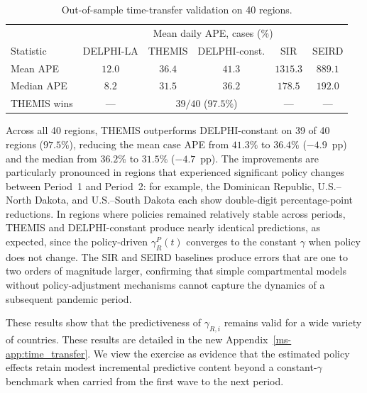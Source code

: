 \documentclass[letterpaper,twoside,11pt]{reviewresponse}
\begin{document}
\begin{enumerate}
    \begin{table}[h!]
    \centering
    \begin{tabular}{|l|ccccc|}
    \hline
    & \multicolumn{5}{c|}{Mean daily APE, cases (\%)} \\
    Statistic & DELPHI-LA  & THEMIS & DELPHI-const. & SIR & SEIRD \\\hline
    Mean APE   & $12.0$  & $\mathbf{36.4}$ & $41.3$ & $1315.3$ & $889.1$ \\
    Median APE & $8.2$   & $\mathbf{31.5}$ & $36.2$ & $178.5$  & $192.0$ \\
    THEMIS wins & --- & \multicolumn{2}{c}{$39/40$ ($97.5\%$)} & --- & --- \\\hline
    \end{tabular}
    \caption{Out-of-sample time-transfer validation on 40 regions.}
    \label{tab:time_transfer_expanded}
    \end{table}
    
    Across all 40 regions, THEMIS outperforms DELPHI-constant on 39 of 40 regions ($97.5\%$), reducing the mean case APE from $41.3\%$ to $36.4\%$ ($-4.9$~pp) and the median from $36.2\%$ to $31.5\%$ ($-4.7$~pp). The improvements are particularly pronounced in regions that experienced significant policy changes between Period~1 and Period~2: for example, the Dominican Republic, U.S.--North Dakota, and U.S.--South Dakota each show double-digit percentage-point reductions. In regions where policies remained relatively stable across periods, THEMIS and DELPHI-constant produce nearly identical predictions, as expected, since the policy-driven $\gamma_R^P(t)$ converges to the constant $\gamma$ when policy does not change. The SIR and SEIRD baselines produce errors that are one to two orders of magnitude larger, confirming that simple compartmental models without policy-adjustment mechanisms cannot capture the dynamics of a subsequent pandemic period.

	These results show that the predictiveness of $\gamma_{R,i}$ remains valid for a wide variety of countries. These results are detailed in the new Appendix~\ref*{ms-app:time_transfer}. We view the exercise as evidence that the estimated policy effects retain modest incremental predictive content beyond a constant-$\gamma$ benchmark when carried from the first wave to the next period.

\end{enumerate}

\end{document}
